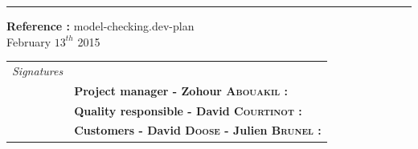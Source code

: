 \documentclass{report}
\begin{document}
\begin{titlepage}


\vspace*{4.5cm}

\noindent
\begin{minipage}{0.35\linewidth}
    \begin{flushright}
        \printauthor
    \end{flushright}
\end{minipage} \hspace{15pt}
%
\begin{minipage}{0.02\linewidth}
    \rule{1pt}{175pt}
\end{minipage} \hspace{-10pt}
%
\begin{minipage}{0.6\linewidth}
\vspace{5pt}
\newenvironment{test}{\begin{center}}{\end{center}}
\hspace{10pt}
\begin{minipage}{\linewidth} 
\textbf{Reference :} model-checking.dev-plan ~\\
February $13^{th}$ 2015
\end{minipage}
\end{minipage}

\vspace{8cm}
\begin{minipage}{0.20\linewidth}
    \begin{flushright}
       
        \begin{tabular}{ll}
     \textit{Signatures} & \\
            & \textbf{Project manager - Zohour \textsc{Abouakil} :} \\
            & \textbf{Quality responsible - David \textsc{Courtinot} :} \\
            & \textbf{Customers - David \textsc{Doose} - Julien \textsc{Brunel} :} \\
        \end{tabular}
    \end{flushright}
\end{minipage}

\end{titlepage}
\restoregeometry
\tableofcontents
{}
\end{document}
